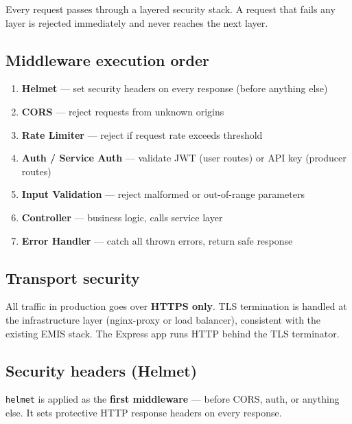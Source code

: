\documentclass[11pt]{article}
\begin{document}
\begin{keybox}
Every request passes through a layered security stack. A request that fails any layer is
rejected immediately and never reaches the next layer.
\end{keybox}

\subsection{Middleware execution order}

\begin{enumerate}
  \item \textbf{Helmet} --- set security headers on every response (before anything else)
  \item \textbf{CORS} --- reject requests from unknown origins
  \item \textbf{Rate Limiter} --- reject if request rate exceeds threshold
  \item \textbf{Auth / Service Auth} --- validate JWT (user routes) or API key (producer routes)
  \item \textbf{Input Validation} --- reject malformed or out-of-range parameters
  \item \textbf{Controller} --- business logic, calls service layer
  \item \textbf{Error Handler} --- catch all thrown errors, return safe response
\end{enumerate}

\subsection{Transport security}

All traffic in production goes over \textbf{HTTPS only}. TLS termination is handled at the
infrastructure layer (nginx-proxy or load balancer), consistent with the existing EMIS stack.
The Express app runs HTTP behind the TLS terminator.

\subsection{Security headers (Helmet)}

\texttt{helmet} is applied as the \textbf{first middleware} --- before CORS, auth, or anything
else. It sets protective HTTP response headers on every response.
\end{document}
